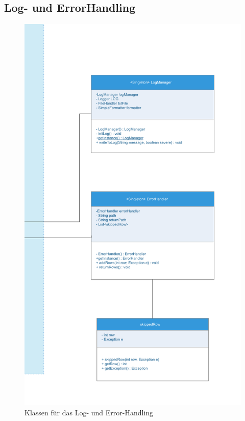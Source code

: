 \subsection{Log- und ErrorHandling}
\begin{figure}[!h]
\centering
\includegraphics[scale=0.6]{uml/screenshots/errors-2}
\caption{Klassen für das Log- und Error-Handling}
\end{figure}
\clearpage


\clearpage

\clearpage

\clearpage



